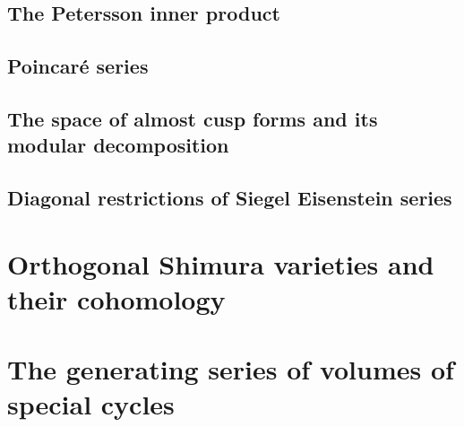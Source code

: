 \documentclass[11pt,a4paper,notitlepage,oneside]{amsart}
\begin{document}
	\subsection{The Petersson inner product}
	
	\subsection{Poincaré series}\label{sec;poincser}
	
	\subsection{The space of almost cusp forms and its modular decomposition}\label{sec;mod_dec}
	
%	
	\subsection{Diagonal restrictions of Siegel Eisenstein series}\label{sec;diagonalrestr_vv}
	
	\section{Orthogonal Shimura varieties and their cohomology}\label{sec;digressdiffgeo}
	
	
%	
	\section{The generating series of volumes of special cycles}\label{sec;volofspeccyinKM}
	
%	
%	
\end{document}
